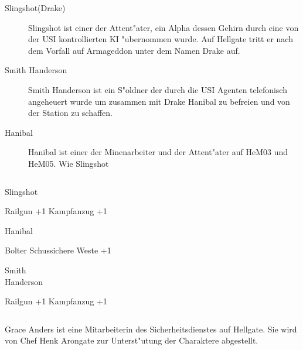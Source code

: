 \begin{column}[l]{0.45}
    \begin{description}
        \item[Slingshot(Drake)] Slingshot ist einer der Attent"ater, ein Alpha dessen Gehirn durch eine von der USI 
            kontrollierten KI "ubernommen wurde. Auf Hellgate tritt er nach dem Vorfall auf Armageddon unter dem Namen Drake auf.
        \item[Smith Handerson] Smith Handerson ist ein S"oldner der durch die USI Agenten telefonisch angeheuert wurde um 
            zusammen mit Drake Hanibal zu befreien und von der Station zu schaffen.
        \item[Hanibal] Hanibal ist einer der Minenarbeiter und der Attent"ater auf HeM03 und HeM05. Wie Slingshot 
    \end{description}
\end{column}
\begin{column}[r]{0.45}
    \begin{nscsheet}[h]{Slingshot}
        \nscstats[ATT=1,AGG=2,DEX=3]
        \nscruler
        \begin{nscinventory}
            \nscitem[Waffen] Railgun +1
            \nscitem[R"ustung] Kampfanzug +1
        \end{nscinventory}
    \end{nscsheet}    

    \begin{nscsheet}[h]{Hanibal}
        \nscstats[ATT=1,AGG=2,DEX=3,COM=2,CON=2]
        \nscruler
        \begin{nscinventory}
            \nscitem[Waffen] Bolter
            \nscitem[R"ustung] Schussichere Weste +1
        \end{nscinventory}
    \end{nscsheet} 

    \begin{nscsheet}[h]{Smith\\ Handerson}
        \nscstats[ATT=3,AGG=2]
        \nscruler
        \begin{nscinventory}
            \nscitem[Waffen] Railgun +1
            \nscitem[R"ustung] Kampfanzug +1
        \end{nscinventory}
    \end{nscsheet}
\end{column}


\newpage
{}

Grace Anders ist eine Mitarbeiterin des Sicherheitsdienstes auf Hellgate. Sie wird von Chef Henk Arongate zur 
Unterst"utung der Charaktere abgestellt. 

